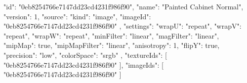 {
  "id": "0eb8254766e7147dd23cd4231f986f90",
  "name": "Painted Cabinet Normal",
  "version": 1,
  "source": {
    "kind": "image",
    "imageId": "0eb8254766e7147dd23cd4231f986f90"
  },
  "settings": {
    "wrapU": "repeat",
    "wrapV": "repeat",
    "wrapW": "repeat",
    "minFilter": "linear",
    "magFilter": "linear",
    "mipMap": true,
    "mipMapFilter": "linear",
    "anisotropy": 1,
    "flipY": true,
    "precision": "low",
    "colorSpace": "srgb"
  },
  "textureIds": [
    "0eb8254766e7147dd23cd4231f986f90"
  ],
  "imageIds": [
    "0eb8254766e7147dd23cd4231f986f90"
  ]
}
